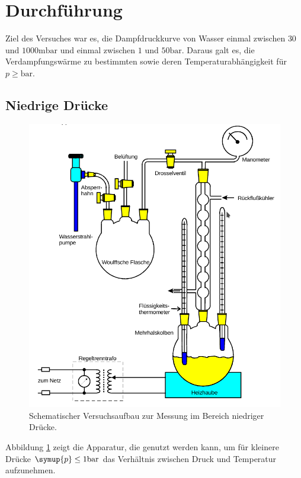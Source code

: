 

\section{Durchführung}
\label{sec:Durchführung}
Ziel des Versuches war es, die Dampfdruckkurve von Wasser einmal zwischen $30$ und $1000 \si{\milli\bar}$
und einmal zwischen $1$ und $50 \si{\bar}$. Daraus galt es, die Verdampfungswärme zu bestimmten
sowie deren Temperaturabhängigkeit für $p \geq \si{\bar}$.

\subsection{Niedrige Drücke}
\begin{figure}
    \centering
    \includegraphics[width=\textwidth]{apparatur1.png}
    \caption{Schematischer Versuchsaufbau zur Messung im Bereich niedriger Drücke.}
    \label{fig:app1}
\end{figure}
Abbildung \ref{fig:app1} zeigt die Apparatur, die genutzt werden kann, um für kleinere Drücke $\symup{p} \leq 1 \si{\bar}$
das Verhältnis zwischen Druck und Temperatur aufzunehmen. \\
